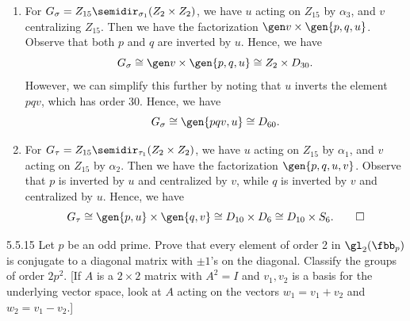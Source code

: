 \begin{solenum}[spsol]
\begin{itemize}
\begin{enumerate}
	Observe that $p$ is centralized by $u$, and $q$ is inverted by $u$.
	Hence, we have
            \[
            	G_\rho \cong \gen v \times \gen p \times \gen{q, u} \cong Z_2 \times Z_5 \times D_6 \cong Z_{10} \times D_6.
            \]
            \item For $G_\sigma = Z_{15} \semidir_{\sigma_1} (Z_2 \times Z_2)$, we have $u$ acting on $Z_{15}$ by $\alpha_3$, and $v$ centralizing $Z_{15}$.
	Then we have the factorization $\gen v \times \gen{p, q, u}$.
	Observe that both $p$ and $q$ are inverted by $u$.
	Hence, we have
            \[
            	G_\sigma \cong \gen v \times \gen{p, q, u} \cong Z_2 \times D_{30}.
            \]
            However, we can simplify this further by noting that $u$ inverts the element $pqv$, which has order 30.
	Hence, we have
            \[
            	G_\sigma \cong \gen{pqv, u} \cong D_{60}.
            \]
            \item For $G_\tau = Z_{15} \semidir_{\tau_1} (Z_2 \times Z_2)$, we have $u$ acting on $Z_{15}$ by $\alpha_1$, and $v$ acting on $Z_{15}$ by $\alpha_2$.
	Then we have the factorization $\gen{p, q, u, v}$.
	Observe that $p$ is inverted by $u$ and centralized by $v$, while $q$ is inverted by $v$ and centralized by $u$.
	Hence, we have
            \[
            	G_\tau \cong \gen{p, u} \times \gen{q, v} \cong D_{10} \times D_6 \cong D_{10} \times S_6. \qedhere
            \]
        \end{enumerate}
    \end{itemize}
\end{solenum}

\begin{exercise}{5.5.15}
    Let $p$ be an odd prime.
	Prove that every element of order 2 in $\gl_2(\fbb_p)$ is conjugate to a diagonal matrix with $\pm 1$'s on the diagonal.
	Classify the groups of order $2p^2$. [If $A$ is a $2 \times 2$ matrix with $A^2 = I$ and $v_1, v_2$ is a basis for the underlying vector space, look at $A$ acting on the vectors $w_1 = v_1 + v_2$ and $w_2 = v_1 - v_2$.]
\end{exercise}

